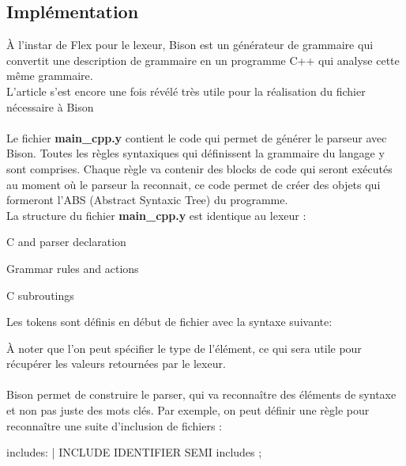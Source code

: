 \documentclass[a4paper]{article}%
\begin{document}
\subsection{Implémentation}

À l'instar de Flex pour le lexeur, Bison est un générateur de grammaire qui convertit une description de grammaire en un programme C++ qui analyse cette même grammaire.\\
L'article \cite{compilerFlexBison} s'est encore une fois révélé très utile pour la réalisation du fichier nécessaire à Bison\\~\\
 Le fichier \textbf{main\_cpp.y} contient le code qui permet de générer le parseur avec Bison. Toutes les règles syntaxiques qui définissent la grammaire du langage y sont comprises.
Chaque règle va contenir des blocks de code qui seront exécutés au moment où le parseur la reconnait, ce code permet de créer des objets qui formeront l'ABS (Abstract Syntaxic Tree) du programme.\\


La structure du fichier \textbf{main\_cpp.y} est identique au lexeur :

\begin{code}
C and parser declaration

Grammar rules and actions

C subroutings
\end{code}\leavevmode\newline

Les tokens sont définis en début de fichier avec la syntaxe suivante:

\begin{code}
\end{code}\leavevmode\newline

À noter que l'on peut spécifier le type de l'élément, ce qui sera utile pour
récupérer les valeurs retournées par le lexeur.\\~\\


Bison permet de construire le parser, qui va reconnaître des éléments de syntaxe
et non pas juste des mots clés. Par exemple, on peut définir une règle pour
reconnaître une suite d'inclusion de fichiers :\\

\begin{code}[language=c++]
includes: %
       | INCLUDE IDENTIFIER SEMI includes
       ;
\end{code}\leavevmode\newline
\end{document}
